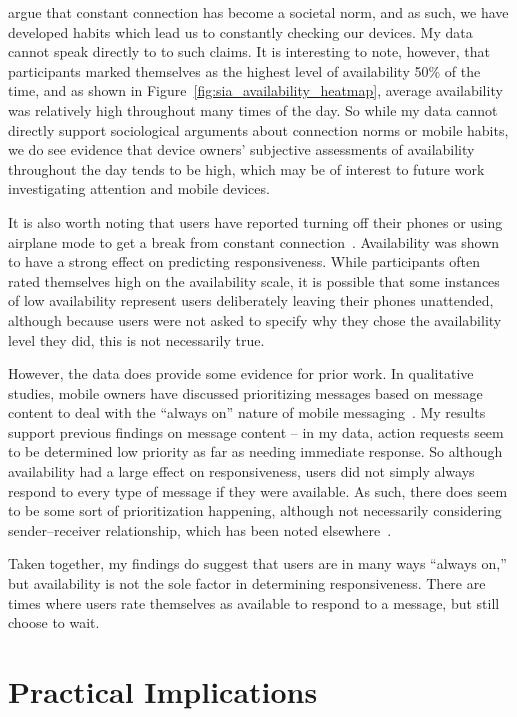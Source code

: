 \documentclass[12pt]{nuthesis}	%
\begin{document}
\citet{bayer2015connection} argue that constant connection has become a societal norm, and as such, we have developed habits which lead us to constantly checking our devices. My data cannot speak directly to to such claims. It is interesting to note, however, that participants marked themselves as the highest level of availability 50\% of the time, and as shown in Figure~\ref{fig:sia_availability_heatmap}, average availability was relatively high throughout many times of the day. So while my data cannot directly support sociological arguments about connection norms or mobile habits, we do see evidence that device owners' subjective assessments of availability throughout the day tends to be high, which may be of interest to future work investigating attention and mobile devices.

It is also worth noting that users have reported turning off their phones or using airplane mode to get a break from constant connection~\citep{ames2013managing,smith2015us}. Availability was shown to have a strong effect on predicting responsiveness. While participants often rated themselves high on the availability scale, it is possible that some instances of low availability represent users deliberately leaving their phones unattended, although because users were not asked to specify why they chose the availability level they did, this is not necessarily true.

However, the data does provide some evidence for prior work. In qualitative studies, mobile owners have discussed prioritizing messages based on message content to deal with the ``always on'' nature of mobile messaging~\citep[e.g.,][]{cui2016beyond,wohn2015ambient}. My results support previous findings on message content -- in my data, action requests seem to be determined low priority as far as needing immediate response. So although availability had a large effect on responsiveness, users did not simply always respond to every type of message if they were available. As such, there does seem to be some sort of prioritization happening, although not necessarily considering sender--receiver relationship, which has been noted elsewhere~\citep{laursen2005please,wohn2015ambient}.

Taken together, my findings do suggest that users are in many ways ``always on,'' but availability is not the sole factor in determining responsiveness. There are times where users rate themselves as available to respond to a message, but still choose to wait.


\section{Practical Implications}
\end{document}
